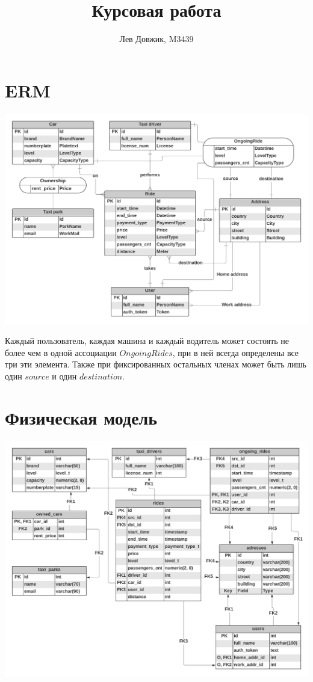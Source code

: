 \documentclass[fontsize=12pt]{article}
\title{Курсовая работа}
\author{Лев Довжик, M3439}
\date{}
\begin{document}
	\maketitle
	
\section{ERM}

\includegraphics[scale=0.72]{Taxi.png}

Каждый пользователь, каждая машина и каждый водитель может состоять не более чем в одной ассоциации $OngoingRides$, при в ней всегда определены все три эти элемента. Также при фиксированных остальных членах может быть лишь один $source$ и один $destination$.

\section{Физическая модель}

\includegraphics[scale=0.7]{Taxi_phys.png}
\end{document}
